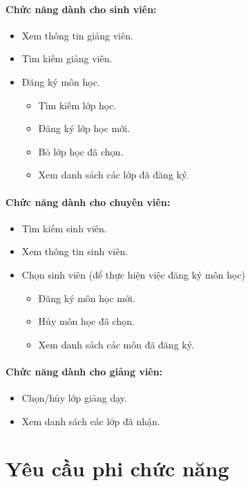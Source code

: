 \documentclass[12pt]{book}
\begin{document}
    \paragraph{Chức năng dành cho sinh viên:}
    \begin{itemize}
      \item Xem thông tin giảng viên.
      \item Tìm kiếm giảng viên.
      \item Đăng ký môn học.
      \begin{itemize}
        \item Tìm kiếm lớp học.
        \item Đăng ký lớp học mới.
        \item Bỏ lớp học đã chọn.
        \item Xem danh sách các lớp đã đăng ký.
      \end{itemize}
    \end{itemize}

    \paragraph{Chức năng dành cho chuyên viên:}
    \begin{itemize}
      \item Tìm kiếm sinh viên.
      \item Xem thông tin sinh viên.
      \item Chọn sinh viên (để thực hiện việc đăng ký môn học)
      \begin{itemize}
        \item Đăng ký môn học mới.
        \item Hủy môn học đã chọn.
        \item Xem danh sách các môn đã đăng ký.
      \end{itemize}
    \end{itemize}

    \paragraph{Chức năng dành cho giảng viên:}
    \begin{itemize}
      \item Chọn/hủy lớp giảng dạy.
      \item Xem danh sách các lớp đã nhận.
    \end{itemize}

  \section{Yêu cầu phi chức năng}
\end{document}
